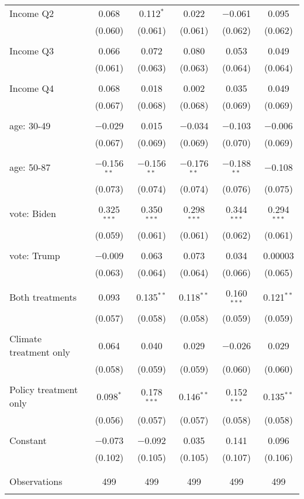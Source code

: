 \begin{tabular}{@{\extracolsep{5pt}}lccccc}
 Income Q2 & 0.068 & 0.112$^{*}$ & 0.022 & $-$0.061 & 0.095 \\ 
  & (0.060) & (0.061) & (0.061) & (0.062) & (0.062) \\ 
  & & & & & \\ 
 Income Q3 & 0.066 & 0.072 & 0.080 & 0.053 & 0.049 \\ 
  & (0.061) & (0.063) & (0.063) & (0.064) & (0.064) \\ 
  & & & & & \\ 
 Income Q4 & 0.068 & 0.018 & 0.002 & 0.035 & 0.049 \\ 
  & (0.067) & (0.068) & (0.068) & (0.069) & (0.069) \\ 
  & & & & & \\ 
 age: 30-49 & $-$0.029 & 0.015 & $-$0.034 & $-$0.103 & $-$0.006 \\ 
  & (0.067) & (0.069) & (0.069) & (0.070) & (0.069) \\ 
  & & & & & \\ 
 age: 50-87 & $-$0.156$^{**}$ & $-$0.156$^{**}$ & $-$0.176$^{**}$ & $-$0.188$^{**}$ & $-$0.108 \\ 
  & (0.073) & (0.074) & (0.074) & (0.076) & (0.075) \\ 
  & & & & & \\ 
 vote: Biden & 0.325$^{***}$ & 0.350$^{***}$ & 0.298$^{***}$ & 0.344$^{***}$ & 0.294$^{***}$ \\ 
  & (0.059) & (0.061) & (0.061) & (0.062) & (0.061) \\ 
  & & & & & \\ 
 vote: Trump & $-$0.009 & 0.063 & 0.073 & 0.034 & 0.00003 \\ 
  & (0.063) & (0.064) & (0.064) & (0.066) & (0.065) \\ 
  & & & & & \\ 
 Both treatments & 0.093 & 0.135$^{**}$ & 0.118$^{**}$ & 0.160$^{***}$ & 0.121$^{**}$ \\ 
  & (0.057) & (0.058) & (0.058) & (0.059) & (0.059) \\ 
  & & & & & \\ 
 Climate treatment only & 0.064 & 0.040 & 0.029 & $-$0.026 & 0.029 \\ 
  & (0.058) & (0.059) & (0.059) & (0.060) & (0.060) \\ 
  & & & & & \\ 
 Policy treatment only & 0.098$^{*}$ & 0.178$^{***}$ & 0.146$^{**}$ & 0.152$^{***}$ & 0.135$^{**}$ \\ 
  & (0.056) & (0.057) & (0.057) & (0.058) & (0.058) \\ 
  & & & & & \\ 
 Constant & $-$0.073 & $-$0.092 & 0.035 & 0.141 & 0.096 \\ 
  & (0.102) & (0.105) & (0.105) & (0.107) & (0.106) \\ 
  & & & & & \\ 
\hline \\[-1.8ex] 

Observations & 499 & 499 & 499 & 499 & 499 \\ 
\hline 
\hline \\[-1.8ex] 
\end{tabular} 